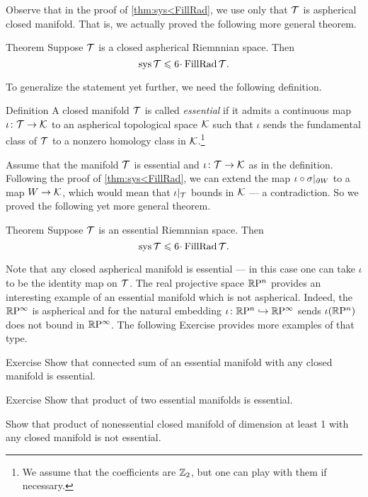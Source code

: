 Observe that in the proof of \ref{thm:sys<FillRad}, we use only that $\mathcal{T}$ is aspherical closed manifold.
That is, we actually proved the following more general theorem.

\begin{thm}{Theorem}\label{thm:sys<FillRad+}
Suppose $\mathcal{T}$ is a closed aspherical Riemnnian space.
Then 
\[\sys\spc{T}\le 6 \cdot \FillRad \spc{T}.\]
\end{thm}


To generalize the statement yet further, we need the following definition.

\begin{thm}{Definition}
A closed manifold $\mathcal{T}$ is called \emph{essential} if it admits a continuous map $\iota\colon\mathcal{T}\to \mathcal{K}$ to an aspherical topological space $\mathcal{K}$ such that $\iota$ sends the fundamental class of $\mathcal{T}$ to a nonzero homology class in $\mathcal{K}$.\footnote{We assume that the coefficients are $\mathbb{Z}_2$, but one can play with them if necessary.}
\end{thm}

Assume that the manifold $\mathcal{T}$ is essential and $\iota \colon\mathcal{T}\to \mathcal{K}$ as in the definition.
Following the proof of \ref{thm:sys<FillRad}, we can extend the map $\iota\z\circ\sigma|_{\partial W}$ to a map $W\to \mathcal{K}$, which would mean that $\iota|_{\mathcal{T}}$ bounds in $\mathcal{K}$ --- a contradiction.
So we proved the following yet more general theorem.

\begin{thm}{Theorem}\label{thm:sys<FillRad++}
Suppose $\mathcal{T}$ is an essential Riemnnian space.
Then 
\[\sys\spc{T}\le 6 \cdot \FillRad \spc{T}.\]
\end{thm}

Note that any closed aspherical manifold is essential --- in this case one can take $\iota$ to be the identity map on $\mathcal{T}$.
The real projective space $\mathbb{R}\mathrm{P}^n$ provides an interesting example of an essential manifold which is not aspherical.
Indeed, the $\mathbb{R}\mathrm{P}^\infty$ is aspherical and for the natural embedding $\iota\colon\mathbb{R}\mathrm{P}^n\hookrightarrow\mathbb{R}\mathrm{P}^\infty$ sends $\iota(\mathbb{R}\mathrm{P}^n)$ does not bound in $\mathbb{R}\mathrm{P}^\infty$.
The following Exercise provides more examples of that type.

\begin{thm}{Exercise}\label{ex:connected-sum-essential}
Show that connected sum of an essential manifold with any closed manifold is essential.
\end{thm}

\begin{thm}{Exercise}\label{ex:product-essential}
Show that product of two essential manifolds is essential.

Show that product of nonessential closed manifold of dimension at least 1 with any closed manifold is not essential.
\end{thm}

